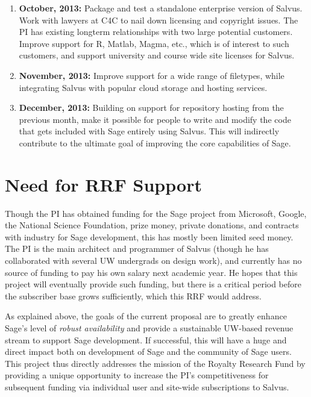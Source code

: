 \documentclass[11pt]{article}
\begin{document}
\begin{enumerate}
\item {\bf October, 2013:} Package and test a standalone enterprise
  version of Salvus.  Work with lawyers at C4C to nail down licensing
  and copyright issues. The PI has existing longterm relationships
  with two large potential customers.  Improve support
  for R, Matlab, Magma, etc., which is of interest to such customers,
  and support university and course wide site licenses for Salvus.

\item {\bf November, 2013:} Improve support for a wide range of
  filetypes, while integrating Salvus with popular cloud storage and
  hosting services.
\item {\bf December, 2013:} Building on support for repository hosting
  from the previous month, make it possible for people to write and
  modify the code that gets included with Sage entirely using Salvus.
  This will indirectly contribute to the ultimate goal of improving
  the core capabilities of Sage.
\end{enumerate}


\section{Need for RRF Support}

Though the PI has obtained funding for the Sage project from
Microsoft, Google, the National Science Foundation, prize money,
private donations, and contracts with industry for Sage development,
this has mostly been limited seed money.  The PI is the main architect
and programmer of Salvus (though he has collaborated with several UW
undergrads on design work), and currently has no source of funding to
pay his own salary next academic year.  He hopes that this project
will eventually provide such funding, but there is a critical period
before the subscriber base grows sufficiently, which this RRF would
address.


As explained above, the goals of the current proposal are to greatly enhance Sage's level
of {\em robust availability} and provide a sustainable UW-based
revenue stream to support Sage development.  If successful, this will
have a huge and direct impact both on development of Sage and the
community of Sage users.  This project thus directly addresses the
mission of the Royalty Research Fund by providing a unique opportunity
to increase the PI's competitiveness for subsequent funding via
individual user and site-wide subscriptions to Salvus.
\end{document}
